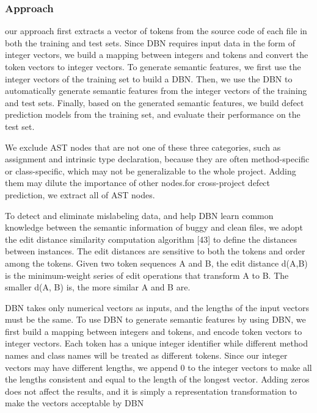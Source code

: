 \documentclass{article}
\begin{document}
\subsubsection{Approach}
our approach first extracts a vector of tokens from the source code of each file in both the training and test sets. Since DBN requires input data in the form of integer vectors, we build a mapping between integers and tokens and convert the token vectors to integer vectors. To generate semantic features, we first use the integer vectors of the training set to build a DBN. Then, we use the DBN to automatically generate semantic features from the integer vectors of the training and test sets. Finally, based on the generated semantic features, we build defect prediction models from the training set, and evaluate their performance on the test set.

We exclude AST nodes that are not one of these three categories, such as assignment and intrinsic type declaration, because they are often method-specific or class-specific, which may not be generalizable to the whole project. Adding them may dilute the importance of other nodes.for cross-project defect prediction, we extract all of AST nodes.

To detect and eliminate mislabeling data, and help DBN learn common knowledge between the semantic information of buggy and clean files, we adopt the edit distance similarity computation algorithm [43] to define the distances between instances. The edit distances are sensitive to both the tokens and order among the tokens. Given two token sequences A and B, the edit distance d(A,B) is the minimum-weight series of edit operations that transform A to B. The smaller d(A, B) is, the more similar A and B are.

DBN takes only numerical vectors as inputs, and the lengths of the input vectors must be the same. To use DBN to generate semantic features by using DBN, we first build a mapping between integers and tokens, and encode token vectors to integer vectors. Each token has a unique integer identifier while different method names and class names will be treated as different tokens. Since our integer vectors may have different lengths, we append 0 to the integer vectors to make all the lengths consistent and equal to the length of the longest vector. Adding zeros does not affect the results, and it is simply a representation transformation to make the vectors acceptable by DBN
\end{document}
